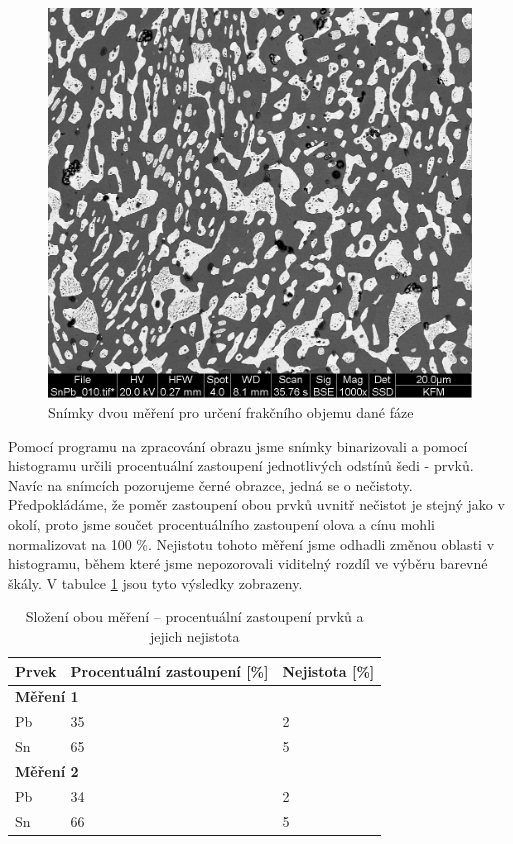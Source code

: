 \begin{figure}[!h]
\begin{minipage}[b]{0.48\linewidth}
        \includegraphics[width=\linewidth]{A18 - SEM/SnPb_010.jpg} %
    \end{minipage}
    \caption{Snímky dvou měření pro určení frakčního objemu dané fáze}
    \label{fig:sn_pb_combined}
\end{figure}

Pomocí programu na zpracování obrazu jsme snímky binarizovali a pomocí histogramu určili procentuální zastoupení jednotlivých odstínů šedi - prvků. Navíc na snímcích pozorujeme černé obrazce, jedná se o nečistoty. Předpokládáme, že poměr zastoupení obou prvků uvnitř nečistot je stejný jako v okolí, proto jsme součet procentuálního zastoupení olova a cínu mohli normalizovat na 100 \%. Nejistotu tohoto měření jsme odhadli změnou oblasti v histogramu, během které jsme nepozorovali viditelný rozdíl ve výběru barevné škály. V tabulce \ref{tab:sn_pb_slozeni} jsou tyto výsledky zobrazeny.

\begin{table}[!h]
    \centering
    \renewcommand{\arraystretch}{1.4}
    \setlength{\tabcolsep}{10pt}
    \begin{tabular}{lll}
        \hline
        \textbf{Prvek} & \textbf{Procentuální zastoupení [\%]} & \textbf{Nejistota [\%]} \\
        \hline
        \multicolumn{3}{l}{\textbf{Měření 1}} \\
        Pb & 35 & 2 \\
        Sn & 65 & 5 \\
        \hline
        \multicolumn{3}{l}{\textbf{Měření 2}} \\
        Pb & 34 & 2 \\
        Sn & 66 & 5 \\
        \hline
    \end{tabular}
    \caption{Složení obou měření – procentuální zastoupení prvků a jejich nejistota}
    \label{tab:sn_pb_slozeni}
\end{table}
    
